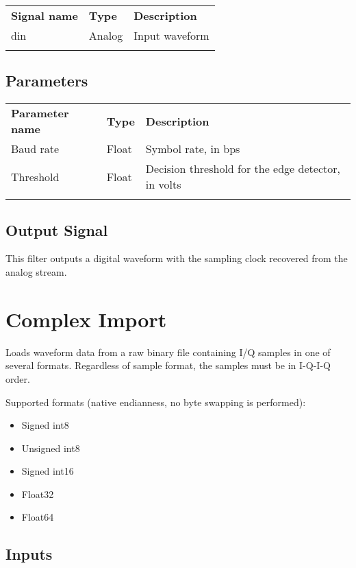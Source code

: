 \begin{tabularx}{16cm}{llX}
\thickhline
\textbf{Signal name} & \textbf{Type} & \textbf{Description} \\
\thickhline
din & Analog & Input waveform \\
\thickhline
\end{tabularx}

\subsection{Parameters}

\begin{tabularx}{16cm}{llX}
\thickhline
\textbf{Parameter name} & \textbf{Type} & \textbf{Description} \\
\thickhline
Baud rate & Float & Symbol rate, in bps \\
\thinhline
Threshold & Float & Decision threshold for the edge detector, in volts \\
\thickhline
\end{tabularx}

\subsection{Output Signal}

This filter outputs a digital waveform with the sampling clock recovered from the analog stream.

\pagebreak
\section{Complex Import}

Loads waveform data from a raw binary file containing I/Q samples in one of several formats. Regardless of sample
format, the samples must be in I-Q-I-Q order.

Supported formats (native endianness, no byte swapping is performed):
\begin{itemize}
\item Signed int8
\item Unsigned int8
\item Signed int16
\item Float32
\item Float64
\end{itemize}

\subsection{Inputs}

